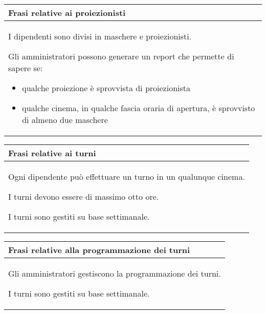 \begin{tabularx}{\linewidth}{|X|}
      \hline
      \rowcolor{tblhdrcolor}
      \textbf{Frasi relative ai proiezionisti} \\\hline
      I dipendenti sono divisi in maschere e proiezionisti.

      Gli amministratori possono generare un report che permette di
      sapere se:
      \begin{itemize}
            \item qualche proiezione è sprovvista di proiezionista
            \item qualche cinema, in qualche fascia oraria di apertura,
                  è sprovvisto di almeno due maschere
      \end{itemize}
      \\ \hline
\end{tabularx}

\begin{tabularx}{\linewidth}{|X|}
      \hline
      \rowcolor{tblhdrcolor}
      \textbf{Frasi relative ai turni} \\\hline
      Ogni dipendente può effettuare un turno in un qualunque cinema.

      I turni devono essere di massimo otto ore.

      I turni sono gestiti su base settimanale.
      \\ \hline
\end{tabularx}

\begin{tabularx}{\linewidth}{|X|}
      \hline
      \rowcolor{tblhdrcolor}
      \textbf{Frasi relative alla programmazione dei turni} \\\hline
      Gli amministratori gestiscono la programmazione dei turni.

      I turni sono gestiti su base settimanale.
      \\ \hline
\end{tabularx}
